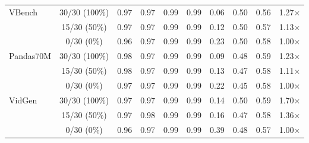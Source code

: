 \begin{table*}[!t]
{\begin{tabular}{l|c|ccccc|cc|c}
\multirow{3}{*}{VBench} 
                & 30/30 (100\%)            & 0.97 & 0.97 & 0.99 & 0.99 & 0.06 & 0.50 & 0.56 & 1.27$\times$ \\
                & 15/30 (50\%)            & 0.97 & 0.97 & 0.99 & 0.99 & 0.12 & 0.50 & 0.57 & 1.13$\times$ \\ 
                & 0/30 (0\%)               & 0.96 & 0.97 & 0.99 & 0.99 & 0.23 & 0.50 & 0.58 & 1.00$\times$ \\ \toprule[1pt] 
\multirow{3}{*}{Pandas70M} 
                & 30/30 (100\%)           & 0.98 & 0.97 & 0.99 & 0.99 & 0.09 & 0.48 & 0.59  & 1.23$\times$ \\
                & 15/30 (50\%)            & 0.98 & 0.97 &  0.99 & 0.99 & 0.13 & 0.47 & 0.58 & 1.11$\times$ \\ 
                & 0/30 (0\%)               & 0.97 & 0.97 & 0.99 & 0.99 & 0.22 & 0.45 & 0.58 & 1.00$\times$ \\ \toprule[1pt] 
\multirow{3}{*}{VidGen} 
                & 30/30 (100\%)            & 0.97 & 0.97 & 0.99 & 0.99 & 0.14 & 0.50 & 0.59 & 1.70$\times$ \\
                & 15/30 (50\%)            & 0.97 & 0.98 & 0.99 & 0.99 & 0.16 & 0.47 & 0.58  & 1.36$\times$ \\ 
                & 0/30 (0\%)               & 0.96 & 0.97 & 0.99 & 0.99 & 0.39 & 0.48 & 0.57 & 1.00$\times$ \\ \toprule[1pt] 
\end{tabular}%
}
\end{table*}
